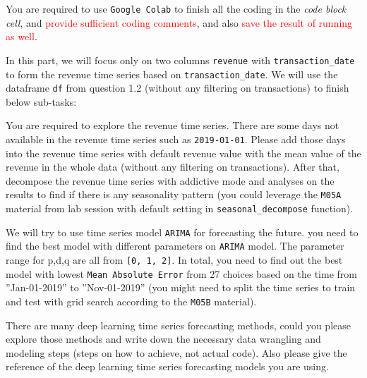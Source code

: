 \documentclass[a4paper]{article}
\begin{document}
    You are required to use \texttt{Google Colab} to 
    finish all the coding in the \textit{code block cell},
    and \textcolor{red}{provide sufficient coding comments},
    and also \textcolor{red}{save the result of running as well}. 

    In this part, we will focus only on two columns \texttt{revenue} with \texttt{transaction_date} to form the revenue time series based on \texttt{transaction_date}.
    We will use the dataframe \texttt{df} from question 1.2 (without any filtering on transactions) to finish below sub-tasks:

    
    \begin{answer}[Question 2.1]
    You are required to explore the revenue time series.
    There are some days not available in the revenue time series such as \texttt{2019-01-01}.
    Please add those days into the revenue time series with default revenue value with 
    the mean value of the revenue in the whole data (without any filtering on transactions).
    After that, decompose the revenue time series with addictive mode and analyses on the results to find if there is any seasonality pattern (you could leverage the \texttt{M05A} material from lab session with default setting in \texttt{seasonal_decompose} function).
    
    \end{answer}

    \begin{answer}[Question 2.2]
    We will try to use time series model \texttt{ARIMA} for forecasting the future. you need to find the best model with different parameters on \texttt{ARIMA} model. The parameter range for p,d,q are all from \texttt{[0, 1, 2]}. In total, you need to find out the best model with lowest \texttt{Mean Absolute Error} from 27 choices based on the time from ”Jan-01-2019” to ”Nov-01-2019” (you might need to split the time series to train and test with grid search according to the \texttt{M05B} material).
    \end{answer}

    \begin{answer}[Question 2.3]
    There are many deep learning time series forecasting methods, could you please explore those methods and write down the necessary data wrangling and modeling steps (steps on how to achieve, not actual code). Also please give the reference of the deep learning time series forecasting models you are using.
    \end{answer}
    
    
    
\end{document}
